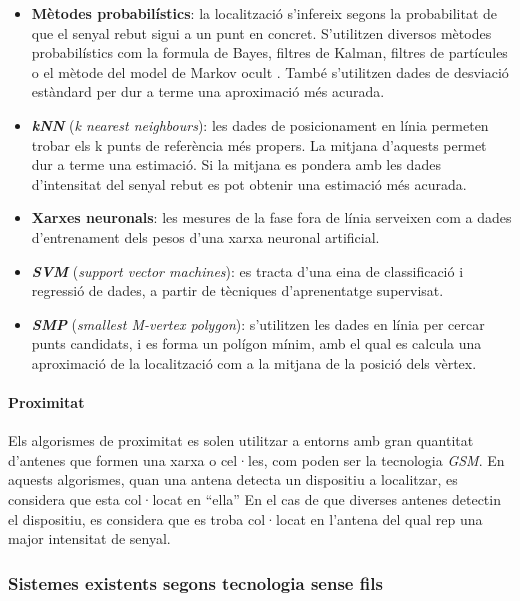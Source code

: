 \begin{itemize}

    \item \textbf{Mètodes probabilístics}: la localització s'infereix segons la probabilitat de que el senyal rebut sigui a un punt en concret. S'utilitzen diversos mètodes probabilístics com la formula de Bayes, filtres de Kalman\cite{glanzer}, filtres de partícules o el mètode del model de Markov ocult \cite{evennou}. També s'utilitzen dades de desviació estàndard per dur a terme una aproximació més acurada.
    \item \textbf{\textit{kNN}} (\textit{k nearest neighbours}): les dades de posicionament en línia permeten trobar els k punts de referència més propers. La mitjana d'aquests permet dur a terme una estimació. Si la mitjana es pondera amb les dades d'intensitat del senyal rebut es pot obtenir una estimació més acurada.
    \item \textbf{Xarxes neuronals}: les mesures de la fase fora de línia serveixen com a dades d'entrenament dels pesos d'una xarxa neuronal artificial.
    \item \textbf{\textit{SVM}} (\textit{support vector machines}): es tracta d'una eina de classificació i regressió de dades, a partir de tècniques d’aprenentatge supervisat.
    \item \textbf{\textit{SMP}} (\textit{smallest M-vertex polygon}): s'utilitzen les dades en línia per cercar punts candidats, i es forma un polígon mínim, amb el qual es calcula una aproximació de la localització com a la mitjana de la posició dels vèrtex.

\end{itemize}

\paragraph{Proximitat}

Els algorismes de proximitat es solen utilitzar a entorns amb gran quantitat d'antenes que formen una xarxa o cel·les, com poden ser la tecnologia \textit{GSM}. En aquests algorismes, quan una antena detecta un dispositiu a localitzar, es considera que esta col·locat en ``ella'' En el cas de que diverses antenes detectin el dispositiu, es considera que es troba col·locat en l'antena del qual rep una major intensitat de senyal.

\subsubsection{Sistemes existents segons tecnologia sense fils}

